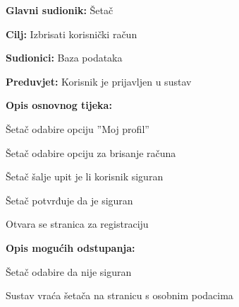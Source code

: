 				\noindent {}
					\begin{packed_item}
	
						\item \textbf{Glavni sudionik:} Šetač
						\item  \textbf{Cilj:} Izbrisati korisnički račun
						\item  \textbf{Sudionici:} Baza podataka
						\item  \textbf{Preduvjet:} Korisnik je prijavljen u sustav
						\item  \textbf{Opis osnovnog tijeka:}
						
						\item[] \begin{packed_enum}
	
							\item Šetač odabire opciju ”Moj profil”
							\item Šetač odabire opciju za brisanje računa
							\item Šetač šalje upit je li korisnik siguran
							\item Šetač potvrđuje da je siguran
							\item Otvara se stranica za registraciju
	
						\end{packed_enum}
						
						\item  \textbf{Opis mogućih odstupanja:}
						
						\item[] \begin{packed_item}
							\item[4.a] Šetač odabire da nije siguran
							\item[] \begin{packed_enum}
								\item Sustav vraća šetača na stranicu s osobnim podacima
							\end{packed_enum}
	
						\end{packed_item}
					\end{packed_item}
					
